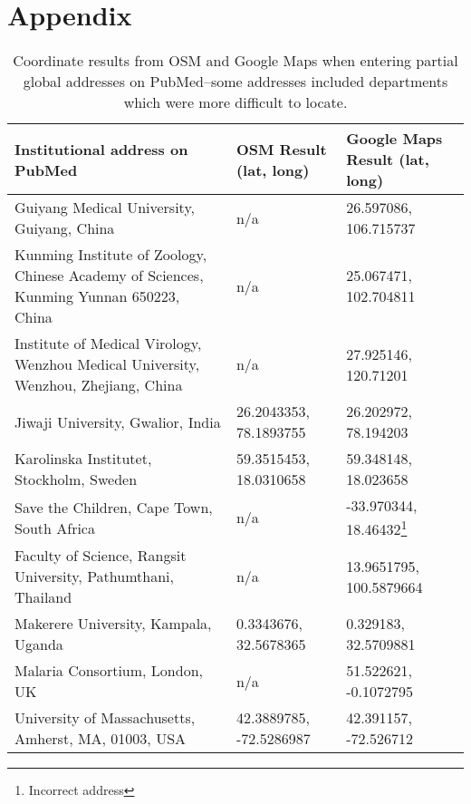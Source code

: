 \documentclass[PROP_AGutteridge_CS.tex]{subfiles}
\begin{document}
\chapter{Appendix}
\begin{table}[h]
\noindent
\begin{tabular}{ | p{6.2cm} | p{4.2cm} | p{4.2cm} | }
    \hline
    \bf{Institutional address on PubMed} & \bf{OSM Result (lat, long)} & \bf{Google Maps Result (lat, long)}\\ \hline
    Guiyang Medical University, Guiyang, China & n/a & 26.597086, 106.715737\\ \hline
    Kunming Institute of Zoology, Chinese Academy of Sciences, Kunming Yunnan 650223, China & n/a & 25.067471, 102.704811\\ \hline
    Institute of Medical Virology, Wenzhou Medical University, Wenzhou, Zhejiang, China & n/a & 27.925146, 120.71201\\ \hline
    Jiwaji University, Gwalior, India & 26.2043353, 78.1893755 & 26.202972, 78.194203\\ \hline
    Karolinska Institutet, Stockholm, Sweden & 59.3515453, 18.0310658 & 59.348148, 18.023658\\ \hline
    Save the Children, Cape Town, South Africa & n/a & -33.970344, 18.46432\footnote{Incorrect address}\\ \hline
    Faculty of Science, Rangsit University, Pathumthani, Thailand & n/a & 13.9651795, 100.5879664\\ \hline
    Makerere University, Kampala, Uganda & 0.3343676, 32.5678365 & 0.329183, 32.5709881\\ \hline
    Malaria Consortium, London, UK & n/a & 51.522621, -0.1072795\\ \hline
    University of Massachusetts, Amherst, MA, 01003, USA & 42.3889785, -72.5286987 & 42.391157, -72.526712\\ \hline
\end{tabular}
\caption{Coordinate results from OSM and Google Maps when entering partial global addresses on PubMed--some addresses included departments which were more difficult to locate.}
\end{table}
\end{document}
